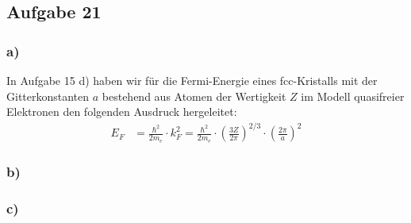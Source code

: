 \subsection*{Aufgabe 21}

\subsubsection*{a)}
In Aufgabe 15 d) haben wir für die Fermi-Energie eines fcc-Kristalls mit der
Gitterkonstanten $a$ bestehend aus Atomen der Wertigkeit $Z$ im Modell
quasifreier Elektronen den folgenden Ausdruck hergeleitet:
\begin{align*}
E_F &=  \frac{\hbar^2}{2 m_e} \cdot k_F^2 =   \frac{\hbar^2}{2 m_e} \cdot
  \left(\frac{3 Z}{2 \pi} \right)^{2/3} \cdot \left(\frac{2 \pi}{a} \right)^2
\end{align*}


\subsubsection*{b)}

\subsubsection*{c)}

